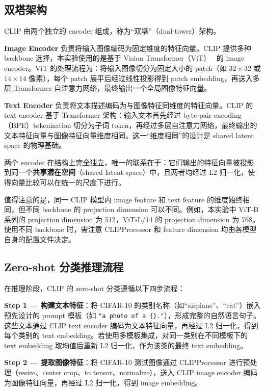 \documentclass[12pt,a4paper]{ctexart}
\begin{document}
\subsection{双塔架构}

CLIP 由两个独立的 encoder 组成，称为“双塔”（dual-tower）架构。

\textbf{Image Encoder} 负责将输入图像编码为固定维度的特征向量。CLIP 提供多种 backbone 选择，本实验使用的是基于 Vision Transformer（ViT）~\cite{dosovitskiy2021vit} 的 image encoder。ViT 的处理流程为：将输入图像切分为固定大小的 patch（如 $32\times32$ 或 $14\times14$ 像素），每个 patch 展平后经过线性投影得到 patch embedding，再送入多层 Transformer 自注意力网络，最终输出一个全局图像特征向量。

\textbf{Text Encoder} 负责将文本描述编码为与图像特征同维度的特征向量。CLIP 的 text encoder 基于 Transformer 架构：输入文本首先经过 byte-pair encoding（BPE）tokenization 切分为子词 token，再经过多层自注意力网络，最终输出的文本特征向量与图像特征向量维度相同。这一“维度相同”的设计是 shared latent space 的物理基础。

两个 encoder 在结构上完全独立，唯一的联系在于：它们输出的特征向量被投影到同一个\textbf{共享潜在空间}（shared latent space）中，且两者均经过 L2 归一化，使得向量比较可以在统一的尺度下进行。

值得注意的是，同一 CLIP 模型内 image feature 和 text feature 的维度始终相同，但不同 backbone 的 projection dimension 可以不同。例如，本实验中 ViT-B 系列的 projection dimension 为 512，ViT-L/14 的 projection dimension 为 768。使用不同 backbone 时，需注意 CLIPProcessor 和 feature dimension 均由各模型自身的配置文件决定。

\subsection{Zero-shot 分类推理流程}

在推理阶段，CLIP 的 zero-shot 分类遵循以下四步流程：

\textbf{Step 1 — 构建文本特征}：将 CIFAR-10 的类别名称（如“airplane”、“cat”）嵌入预先设计的 prompt 模板（如 \texttt{"a photo of a \{\}."}），形成完整的自然语言句子。这些文本通过 CLIP text encoder 编码为文本特征向量，再经过 L2 归一化，得到每个类别的 text embedding。若使用多模板集成，对同一类别在不同模板下的 text embedding 取均值后重新 L2 归一化，作为该类的最终 text embedding。

\textbf{Step 2 — 提取图像特征}：将 CIFAR-10 测试图像通过 CLIPProcessor 进行预处理（resize、center crop、to tensor、normalize），送入 CLIP image encoder 编码为图像特征向量，再经过 L2 归一化，得到 image embedding。
\end{document}
